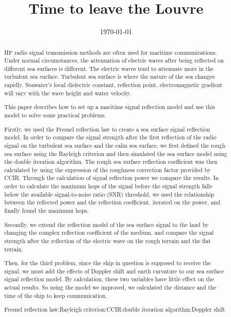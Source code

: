\documentclass{mcmthesis}
\title{Time to leave the Louvre}%
\date{\today}
\begin{document}
\begin{abstract}
HF radio signal transmission methods are often used for maritime communications. Under normal circumstances, the attenuation of electric waves after being reflected on different sea surfaces is different. The electric waves tend to attenuate more in the turbulent sea surface. Turbulent sea surface is where the nature of the sea changes rapidly. Seawater's local dielectric constant, reflection point, electromagnetic gradient will vary with the wave height and water velocity.

This paper describes how to set up a maritime signal reflection model and use this model to solve some practical problems.

Firstly, we used the Fresnel reflection law to create a sea surface signal reflection model. In order to compare the signal strength after the first reflection of the radio signal on the turbulent sea surface and the calm sea surface, we first defined the rough sea surface using the Rayleigh criterion and then simulated the sea surface model using the double iteration algorithm. The rough sea surface reflection coefficient was then calculated by using the expression of the roughness correction factor provided by CCIR. Through the calculation of signal reflection power we compare the results. In order to calculate the maximum hops of the signal before the signal strength falls below the available signal-to-noise ratio (SNR) threshold, we used the relationship between the reflected power and the reflection coefficient, iterated on the power, and finally found the maximum hops.

Secondly, we extend the reflection model of the sea surface signal to the land by changing the complex reflection coefficient of the medium, and compare the signal strength after the reflection of the electric wave on the rough terrain and the flat terrain.

Then, for the third problem, since the ship in question is supposed to receive the signal, we must add the effects of Doppler shift and earth curvature to our sea surface signal reflection model. By calculation, these two variables have little effect on the actual results. So using the model we improved, we calculated the distance and the time of the ship to keep communication.
\begin{keywords}
Fresnel reflection law;Rayleigh criterion;CCIR;double iteration algorithm;Doppler shift%
\end{keywords}
\end{abstract}
\maketitle
\tableofcontents
\newpage
\end{document}
